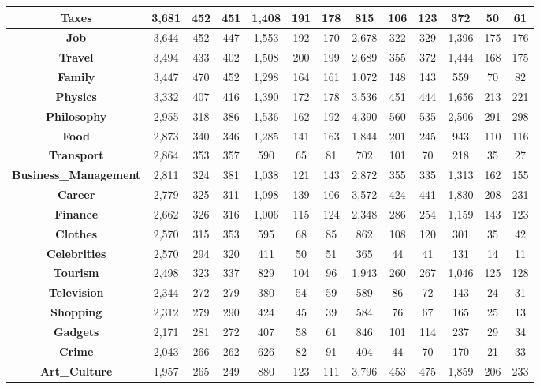 \begin{table}[t]
{\begin{tabular}{|c||c|c|c||c|c|c||c|c|c||c|c|c|}
\textbf{Taxes} & 3,681 & 452 & 451 & 1,408 & 191 & 178 & 815 & 106 & 123 & 372 & 50 & 61\\ \hline
\textbf{Job} & 3,644 & 452 & 447 & 1,553 & 192 & 170 & 2,678 & 322 & 329 & 1,396 & 175 & 176\\ \hline
\textbf{Travel} & 3,494 & 433 & 402 & 1,508 & 200 & 199 & 2,689 & 355 & 372 & 1,444 & 168 & 175\\ \hline
\textbf{Family} & 3,447 & 470 & 452 & 1,298 & 164 & 161 & 1,072 & 148 & 143 & 559 & 70 & 82\\ \hline
\textbf{Physics} & 3,332 & 407 & 416 & 1,390 & 172 & 178 & 3,536 & 451 & 444 & 1,656 & 213 & 221\\ \hline
\textbf{Philosophy} & 2,955 & 318 & 386 & 1,536 & 162 & 192 & 4,390 & 560 & 535 & 2,506 & 291 & 298\\ \hline
\textbf{Food} & 2,873 & 340 & 346 & 1,285 & 141 & 163 & 1,844 & 201 & 245 & 943 & 110 & 116\\ \hline
\textbf{Transport} & 2,864 & 353 & 357 & 590 & 65 & 81 & 702 & 101 & 70 & 218 & 35 & 27\\ \hline
\textbf{Business\_Management} & 2,811 & 324 & 381 & 1,038 & 121 & 143 & 2,872 & 355 & 335 & 1,313 & 162 & 155\\ \hline
\textbf{Career} & 2,779 & 325 & 311 & 1,098 & 139 & 106 & 3,572 & 424 & 441 & 1,830 & 208 & 231\\ \hline
\textbf{Finance} & 2,662 & 326 & 316 & 1,006 & 115 & 124 & 2,348 & 286 & 254 & 1,159 & 143 & 123\\ \hline
\textbf{Clothes} & 2,570 & 315 & 353 & 595 & 68 & 85 & 862 & 108 & 120 & 301 & 35 & 42\\ \hline
\textbf{Celebrities} & 2,570 & 294 & 320 & 411 & 50 & 51 & 365 & 44 & 41 & 131 & 14 & 11\\ \hline
\textbf{Tourism} & 2,498 & 323 & 337 & 829 & 104 & 96 & 1,943 & 260 & 267 & 1,046 & 125 & 128\\ \hline
\textbf{Television} & 2,344 & 272 & 279 & 380 & 54 & 59 & 589 & 86 & 72 & 143 & 24 & 31\\ \hline
\textbf{Shopping} & 2,312 & 279 & 290 & 424 & 45 & 39 & 584 & 76 & 67 & 165 & 25 & 13\\ \hline
\textbf{Gadgets} & 2,171 & 281 & 272 & 407 & 58 & 61 & 846 & 101 & 114 & 237 & 29 & 34\\ \hline
\textbf{Crime} & 2,043 & 266 & 262 & 626 & 82 & 91 & 404 & 44 & 70 & 170 & 21 & 33\\ \hline
\textbf{Art\_Culture} & 1,957 & 265 & 249 & 880 & 123 & 111 & 3,796 & 453 & 475 & 1,859 & 206 & 233\\ \hline

\end{tabular}}
\end{table}
